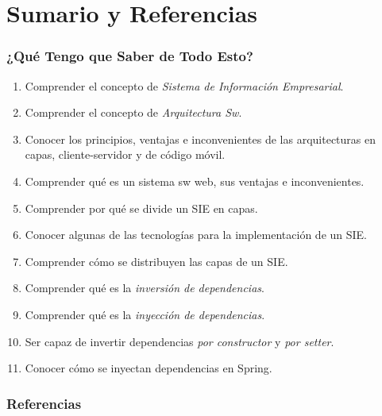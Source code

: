 \documentclass[a4paper,t,xcolor=pst,dvips,colortheme]{beamer}
\begin{document}
\section{Sumario y Referencias}

\begin{frame}[c]
    \frametitle{¿Qué Tengo que Saber de Todo Esto?}
    \begin{enumerate}[<+->]
        \item Comprender el concepto de \emph{Sistema de Información Empresarial}.
        \item Comprender el concepto de \emph{Arquitectura Sw}.
        \item Conocer los principios, ventajas e inconvenientes de las arquitecturas en capas, cliente-servidor y de código móvil.
        \item Comprender qué es un sistema sw web, sus ventajas e inconvenientes.
        \item Comprender por qué se divide un SIE en capas.
        \item Conocer algunas de las tecnologías para la implementación de un SIE.
        \item Comprender cómo se distribuyen las capas de un SIE.
        \item Comprender qué es la \emph{inversión de dependencias}.
        \item Comprender qué es la \emph{inyección de dependencias}.
        \item Ser capaz de invertir dependencias \emph{por constructor} y \emph{por setter}.
        \item Conocer cómo se inyectan dependencias en Spring.
    \end{enumerate}
\end{frame}

\begin{frame}
	\frametitle{Referencias}
    \nocite{}
	
    
\end{frame}
\end{document}
